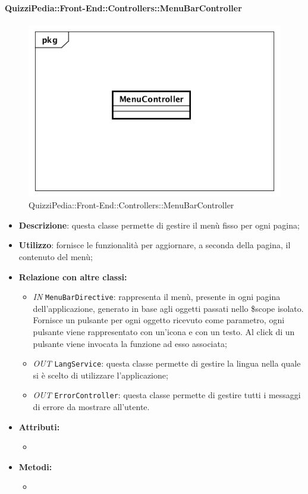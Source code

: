 \paragraph{QuizziPedia::Front-End::Controllers::MenuBarController}
\begin{figure}
	\centering
	\includegraphics[scale=0.45]{UML/Classi/Front-End/QuizziPedia_Front-end_Controller_MenuBarController.png}
	\caption{QuizziPedia::Front-End::Controllers::MenuBarController}
\end{figure}
\begin{itemize}
	\item \textbf{Descrizione}: questa classe permette di gestire il menù fisso per ogni pagina;
	\item \textbf{Utilizzo}: fornisce le funzionalità per aggiornare, a seconda della pagina, il contenuto del menù;
	\item \textbf{Relazione con altre classi:}
	\begin{itemize}
		\item \textit{IN} \texttt{MenuBarDirective}: rappresenta il menù, presente in ogni pagina dell'applicazione, generato in base agli oggetti passati nello \$scope isolato. Fornisce un pulsante per ogni oggetto ricevuto come parametro, ogni pulsante viene rappresentato con un’icona e con un testo. Al click di un pulsante viene invocata la funzione ad esso associata;  
		\item \textit{OUT} \texttt{LangService}: questa classe permette di gestire la lingua nella quale si è scelto di utilizzare l'applicazione;
		\item \textit{OUT} \texttt{ErrorController}: questa classe permette di gestire tutti i messaggi di errore da mostrare all'utente.
	\end{itemize}
	\item \textbf{Attributi:}
	\begin{itemize}
		\item 
	\end{itemize}
	\item \textbf{Metodi:}
	\begin{itemize}
		\item 
	\end{itemize}
\end{itemize}

